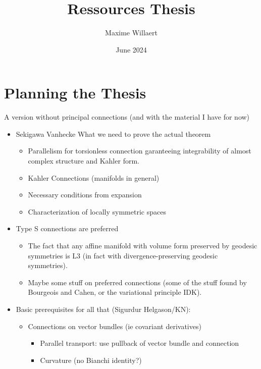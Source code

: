 \documentclass{report}
\title{Ressources Thesis}
\author{Maxime Willaert}
\date{June 2024}
\theoremstyle{definition}
\begin{document}
\maketitle

\tableofcontents

\section{Planning the Thesis}

A version without principal connections (and with the material I have for now)
\begin{itemize}
    \item Sekigawa Vanhecke
    What we need to prove the actual theorem
    \begin{itemize}
        \item Parallelism for torsionless connection garanteeing integrability of almost complex structure and Kahler form.
        \item Kahler Connections (manifolds in general)
        \item Necessary conditions from expansion
        \item Characterization of locally symmetric spaces
    \end{itemize}
    \item Type S connections are preferred
    \begin{itemize}
        \item The fact that any affine manifold with volume form preserved by geodesic symmetries is L3 (in fact with divergence-preserving geodesic symmetries).
        \item Maybe some stuff on preferred connections (some of the stuff found by Bourgeois and Cahen, or the variational principle IDK).
    \end{itemize}
    \item Basic prerequisites for all that (Sigurdur Helgason/KN):
    \begin{itemize}
        \item Connections on vector bundles (ie covariant derivatives)
        \begin{itemize}
            \item Parallel transport: use pullback of vector bundle and connection
        \end{itemize}
        \begin{itemize}
            \item Curvature (no Bianchi identity?)
        \end{itemize}

\end{itemize}
\end{itemize}
\end{document}
